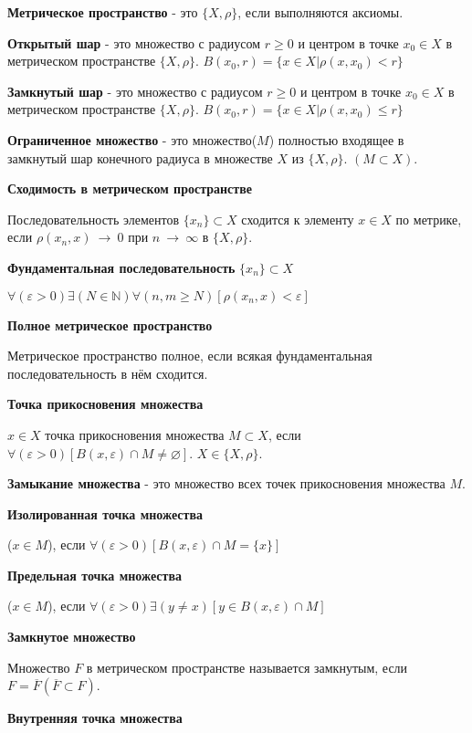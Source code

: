 \textbf{Метрическое пространство} - это $\{X,\rho\}$, если выполняются аксиомы.

\textbf{Открытый шар} - это множество с радиусом $r\geqslant 0$ и центром в точке $x_0\in X$ в метрическом пространстве  $\{X,\rho\}$.
$B(x_0,r)=\{x \in X|\rho(x,x_0)<r \}$

\textbf{Замкнутый шар} - это множество с радиусом $r\geqslant 0$ и центром в точке $x_0\in X$ в метрическом пространстве  $\{X,\rho\}$.
$B(x_0,r)=\{x \in X|\rho(x,x_0)\leqslant r \}$

\textbf{Ограниченное множество} - это множество($M$) полностью входящее в замкнутый шар конечного радиуса в множестве $X$ из $\{X,\rho\}$.
$(M \subset  X) $.

\textbf{Сходимость в метрическом пространстве}

Последовательность элементов $\{x_n \} \subset X$
сходится к элементу $x \in X$ по метрике,
если $\rho(x_n,x)~\longrightarrow~0$ при $n~\longrightarrow~\infty$ в $\{X,\rho\}$.

\textbf{Фундаментальная последовательность} $\{x_n\}\subset X$

$\forall(\varepsilon >0)\exists(N \in \mathbb{N})\forall(n,m\geqslant N)[\rho(x_n,x)<\varepsilon]$

\textbf{Полное метрическое пространство}

Метрическое пространство полное, если всякая фундаментальная последовательность в нём сходится.

\textbf{Точка прикосновения множества}

$x \in X$ точка прикосновения множества $M \subset X$, если $ \forall(\varepsilon>0)[B(x,\varepsilon)\cap M\neq \varnothing ]$. $X \in \{X,\rho\}$.

\textbf{Замыкание множества} - это множество всех точек прикосновения множества $M$.

\textbf{Изолированная точка множества}

($x \in M$), если $\forall(\varepsilon >0)[B(x,\varepsilon)\cap M = \{x\} ]$

\textbf{Предельная точка множества}

($x \in M$), если $ \forall(\varepsilon >0)\exists(y\neq x)[y \in B(x, \varepsilon)\cap M]$

\textbf{Замкнутое множество}

Множество $F$ в метрическом пространстве называется замкнутым, если $F=\overline{F}(\overline{F}\subset F)$.

\textbf{Внутренняя точка множества}

